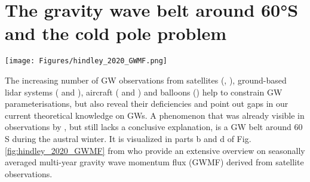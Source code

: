 \section{The gravity wave belt around 60°S and the cold pole problem}
\label{sec:waveBelt} %
%
\begin{figure*}[ht]
    \centering
    \texttt{[image: Figures/hindley\_2020\_GWMF.png]}
    \caption{Stereographic maps of average wintertime zonal (a, b) and meridional (c, d) GWMF near 40 km altitude derived from AIRS/Aqua 3‐D satellite observations for the period 2002–2019. Winter is defined as December–February (June–August) for the Northern (Southern) Hemisphere. GWMF values that are close to zero have been made transparent to reveal the surface features below, and landmarks that lie beneath regions of increased GWMF have been labeled. Inset in the top right of each panel is a stereographic map of the same data but centered on the north and south poles. These inset panels share a color scale with the corresponding 3‐D contours. Panels (e)–(h) show average wintertime zonal and meridional winds at 3 hPa for the period 2002–2019 from ERA5 reanalysis. Taken from \cite{hindley_18year_2020}.}
    \label{fig:hindley_2020_GWMF}
\end{figure*}
%
The increasing number of GW observations from satellites (\cite{hindley_gravity_2019}, \citeyear{hindley_18year_2020}), ground-based lidar systems (\cite{kaifler_lidar_2020} and  \cite{kaifler_compact_2021}), aircraft (\cite{rapp_southtrac-gw_2021} and \cite{fritts_deep_2016}) and  balloons (\cite{plougonven_gravity_2013}) help to constrain GW parameterisations, but also reveal their deficiencies and point out gaps in our current theoretical knowledge on GWs. A phenomenon that was already visible in observations by \textcite{wu_satellite_1996}, but still lacks a conclusive explanation, is a GW belt around 60 \degree S during the austral winter. It is visualized in parts b and d of Fig. \ref{fig:hindley_2020_GWMF} from \textcite{hindley_18year_2020} who provide an extensive overview on seasonally averaged multi-year gravity wave momentum flux (GWMF) derived from satellite observations.



